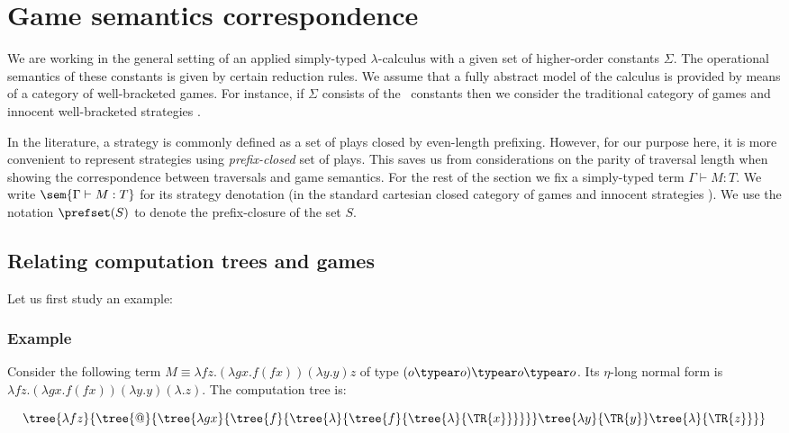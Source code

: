 \bigskip


\section{Game semantics correspondence}
\label{sec:gamesemcorresp}

 We are working in the general setting of an applied
simply-typed $\lambda$-calculus with a given set of higher-order
constants $\Sigma$. The operational semantics of these constants is
given by certain reduction rules. We assume that a fully abstract
model of the calculus is provided by means of a category of
well-bracketed games. For instance, if $\Sigma$ consists
of the \pcf\ constants then we consider the traditional
category of games and innocent well-bracketed strategies
\cite{hylandong_pcf,abramsky94full}.


In the literature, a strategy is commonly defined as a set of plays closed by
even-length prefixing. However, for our purpose here, it is more convenient to represent strategies using \emph{prefix-closed} set of plays. This saves us from considerations on the parity of traversal length when
showing the correspondence between traversals and game semantics.
 For the rest of the section we fix a simply-typed term $\Gamma \vdash M :T$. We write $\sem{\Gamma \vdash M : T}$ for its strategy denotation (in the standard cartesian closed category of games and innocent strategies \cite{abramsky94full, hylandong_pcf}). We use the notation $\prefset(S)$ to denote the prefix-closure of the set $S$.

\subsection{Relating computation trees and games}
Let us first study an example:
\subsubsection{Example}
Consider the following term $M \equiv \lambda f z . (\lambda g x . f (f x)) (\lambda y. y) z$ of type $(o \typear o) \typear o \typear o$.
Its $\eta$-long normal form is $\lambda f z . (\lambda g x . f (f x)) (\lambda y. y) (\lambda .z)$.
The computation tree is:

$$
\tree{\lambda f z}
{ \tree{@}
    {
        \tree{\lambda g x}
            { \tree{f}{   \tree{\lambda}{ \tree{f}{  \tree{\lambda}{\TR{x}}} }  }
            }
        \tree{\lambda y}{\TR{y}}
        \tree{\lambda}{\TR{z}}
    }
}
$$

